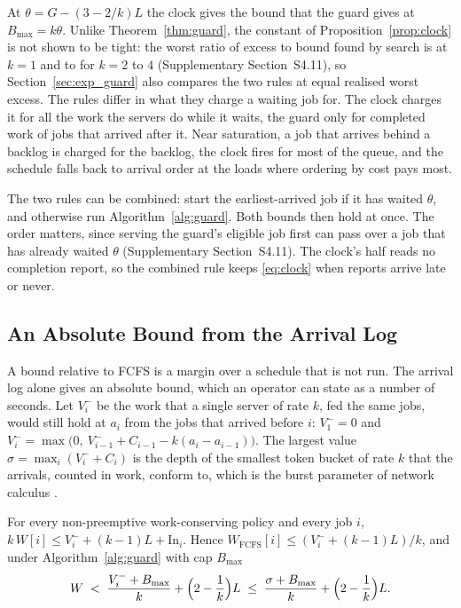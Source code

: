 At $\theta = G - (3-2/k)L$ the clock gives the bound that the guard gives at $B_{\max} =
k\theta$. Unlike Theorem~\ref{thm:guard}, the constant of Proposition~\ref{prop:clock} is
not shown to be tight: the worst ratio of excess to bound found by search is 
at $k = 1$ and  to  for $k = 2$ to $4$ (Supplementary
Section~S4.11), so Section~\ref{sec:exp_guard} also compares the two rules at equal
realised worst excess. The rules differ in what they charge a waiting job for. The clock
charges it for all the work the servers do while it waits, the guard only for completed
work of jobs that arrived after it. Near saturation, a job that arrives behind a backlog is
charged for the backlog, the clock fires for most of the queue, and the schedule falls back
to arrival order at the loads where ordering by cost pays most.

The two rules can be combined: start the earliest-arrived job if it has waited $\theta$,
and otherwise run Algorithm~\ref{alg:guard}. Both bounds then hold at once. The order
matters, since serving the guard's eligible job first can pass over a job that has
already waited $\theta$ (Supplementary Section~S4.11). The clock's half reads no completion
report, so the combined rule keeps \eqref{eq:clock} when reports arrive late or never.

\subsection{An Absolute Bound from the Arrival Log}
\label{sec:absolute}

A bound relative to FCFS is a margin over a schedule that is not run. The arrival log
alone gives an absolute bound, which an operator can state as a number of seconds. Let
$V_i^-$ be the work that a single server of rate $k$, fed the same jobs, would still hold
at $a_i$ from the jobs that arrived before $i$: $V_1^- = 0$ and
$V_i^- = \max\bigl(0,\ V_{i-1}^- + C_{i-1} - k(a_i - a_{i-1})\bigr)$. The largest value
$\sigma = \max_i (V_i^- + C_i)$ is the depth of the smallest token bucket of rate $k$ that
the arrivals, counted in work, conform to, which is the burst parameter of network
calculus \cite{cruz1991calculus,leboudec2001network}.

\begin{proposition}
\label{prop:absolute}
For every non-preemptive work-conserving policy and every job $i$, $k\,W[i] \le V_i^- +
(k-1)L + \mathrm{In}_i$. Hence $W_{\mathrm{FCFS}}[i] \le (V_i^- + (k-1)L)/k$, and under
Algorithm~\ref{alg:guard} with cap $B_{\max}$
\begin{equation}
  W \;<\; \frac{V_i^- + B_{\max}}{k} + \Bigl(2 - \frac{1}{k}\Bigr)L
    \;\le\; \frac{\sigma + B_{\max}}{k} + \Bigl(2 - \frac{1}{k}\Bigr)L .
  \label{eq:absolute}
\end{equation}
\end{proposition}

